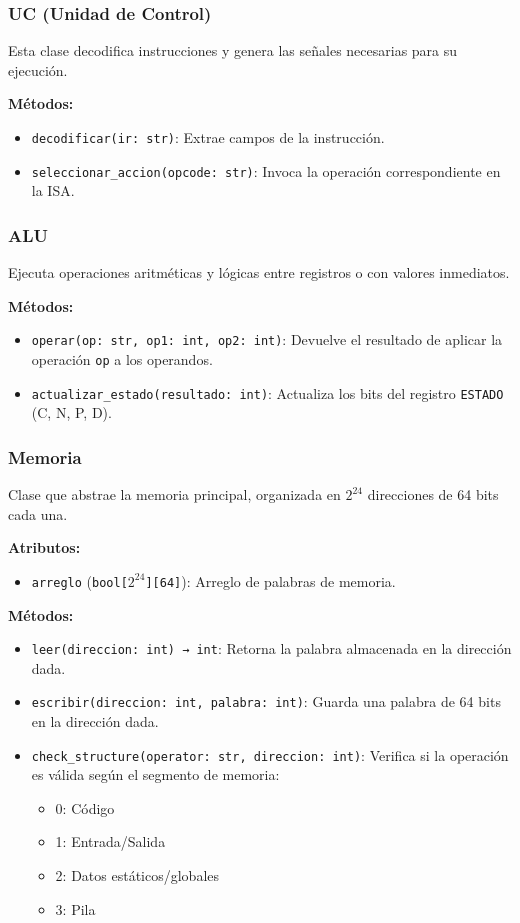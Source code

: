 \documentclass{article}
\begin{document}
\subsubsection*{UC (Unidad de Control)}

Esta clase decodifica instrucciones y genera las señales necesarias para su ejecución.

\textbf{Métodos:}
\begin{itemize}
  \item \texttt{decodificar(ir: str)}: Extrae campos de la instrucción.
  \item \texttt{seleccionar\_accion(opcode: str)}: Invoca la operación correspondiente en la ISA.
\end{itemize}

\subsubsection*{ALU}

Ejecuta operaciones aritméticas y lógicas entre registros o con valores inmediatos.

\textbf{Métodos:}
\begin{itemize}
  \item \texttt{operar(op: str, op1: int, op2: int)}: Devuelve el resultado de aplicar
        la operación \texttt{op} a los operandos.
  \item \texttt{actualizar\_estado(resultado: int)}: Actualiza los bits del
        registro \texttt{ESTADO} (C, N, P, D).
\end{itemize}

\subsubsection*{Memoria}

Clase que abstrae la memoria principal, organizada en $2^{24}$ direcciones de 64 bits cada una.

\textbf{Atributos:}
\begin{itemize}
  \item \texttt{arreglo} (\texttt{bool[$2^{24}$][64]}): Arreglo de palabras de memoria.
\end{itemize}

\textbf{Métodos:}
\begin{itemize}
  \item \texttt{leer(direccion: int) → int}: Retorna la palabra almacenada en la dirección dada.
  \item \texttt{escribir(direccion: int, palabra: int)}: Guarda una palabra de 64 bits en
        la dirección dada.
  \item \texttt{check\_structure(operator: str, direccion: int)}: Verifica si la operación es válida
        según el segmento de memoria:
        \begin{itemize}
          \item 0: Código
          \item 1: Entrada/Salida
          \item 2: Datos estáticos/globales
          \item 3: Pila
        \end{itemize}
\end{itemize}
\end{document}
